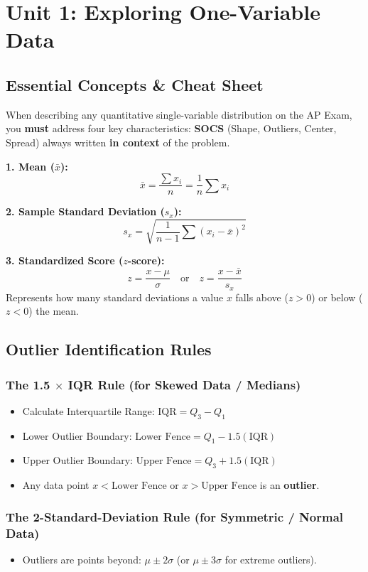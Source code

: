 \chapter{Unit 1: Exploring One-Variable Data}

\section{Essential Concepts \& Cheat Sheet}

When describing any quantitative single-variable distribution on the AP Exam, you \textbf{must} address four key characteristics: \textbf{SOCS} (Shape, Outliers, Center, Spread) always written \textbf{in context} of the problem.

\begin{formulabox}
\textbf{1. Mean ($\bar{x}$):}
\[
\bar{x} = \frac{\sum x_i}{n} = \frac{1}{n} \sum x_i
\]

\textbf{2. Sample Standard Deviation ($s_x$):}
\[
s_x = \sqrt{\frac{1}{n-1}\sum (x_i - \bar{x})^2}
\]

\textbf{3. Standardized Score ($z$-score):}
\[
z = \frac{x - \mu}{\sigma} \quad \text{or} \quad z = \frac{x - \bar{x}}{s_x}
\]
Represents how many standard deviations a value $x$ falls above ($z > 0$) or below ($z < 0$) the mean.
\end{formulabox}

\section{Outlier Identification Rules}

\subsection{The 1.5 $\times$ IQR Rule (for Skewed Data / Medians)}
\begin{itemize}
    \item Calculate Interquartile Range: $\text{IQR} = Q_3 - Q_1$
    \item Lower Outlier Boundary: $\text{Lower Fence} = Q_1 - 1.5(\text{IQR})$
    \item Upper Outlier Boundary: $\text{Upper Fence} = Q_3 + 1.5(\text{IQR})$
    \item Any data point $x < \text{Lower Fence}$ or $x > \text{Upper Fence}$ is an \textbf{outlier}.
\end{itemize}

\subsection{The 2-Standard-Deviation Rule (for Symmetric / Normal Data)}
\begin{itemize}
    \item Outliers are points beyond: $\mu \pm 2\sigma$ (or $\mu \pm 3\sigma$ for extreme outliers).
\end{itemize}

